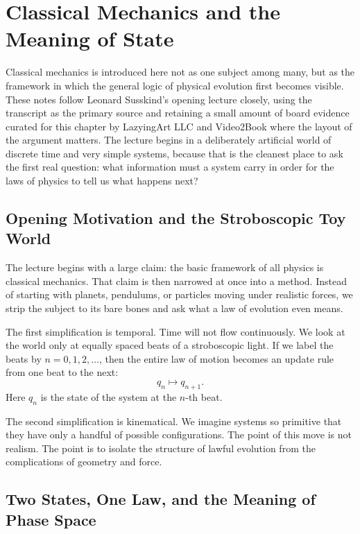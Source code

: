 \chapter{Classical Mechanics and the Meaning of State}

Classical mechanics is introduced here not as one subject among many, but as the framework in which the general logic of physical evolution first becomes visible. These notes follow Leonard Susskind's opening lecture closely, using the transcript as the primary source and retaining a small amount of board evidence curated for this chapter by LazyingArt LLC and Video2Book where the layout of the argument matters. The lecture begins in a deliberately artificial world of discrete time and very simple systems, because that is the cleanest place to ask the first real question: what information must a system carry in order for the laws of physics to tell us what happens next?

\section{Opening Motivation and the Stroboscopic Toy World}

The lecture begins with a large claim: the basic framework of all physics is classical mechanics. That claim is then narrowed at once into a method. Instead of starting with planets, pendulums, or particles moving under realistic forces, we strip the subject to its bare bones and ask what a law of evolution even means.

The first simplification is temporal. Time will not flow continuously. We look at the world only at equally spaced beats of a stroboscopic light. If we label the beats by \(n=0,1,2,\ldots\), then the entire law of motion becomes an update rule from one beat to the next:
\begin{equation}
q_n \mapsto q_{n+1}.
\end{equation}
Here \(q_n\) is the state of the system at the \(n\)-th beat.

The second simplification is kinematical. We imagine systems so primitive that they have only a handful of possible configurations. The point of this move is not realism. The point is to isolate the structure of lawful evolution from the complications of geometry and force.

\section{Two States, One Law, and the Meaning of Phase Space}

